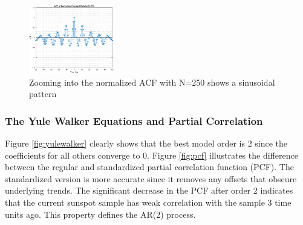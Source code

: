 \begin{figure}[h!]
\centering
\includegraphics[width = 0.33\textwidth]{sunspot_acf_250_zoom}
\caption{Zooming into the normalized ACF with N=250 shows a sinusoidal pattern}
\label{fig:sunspot_acf_250_zoom}
\end{figure}

\pagebreak

\subsubsection{The Yule Walker Equations and Partial Correlation}

Figure \ref{fig:yulewalker} clearly shows that the best model order is 2 since the coefficients for all others converge to 0. Figure \ref{fig:pcf} illustrates the difference between the regular and standardized partial correlation function (PCF). The standardized version is more accurate since it removes any offsets that obscure underlying trends. The significant decrease in the PCF after order 2 indicates that the current sunspot sample has weak correlation with the sample 3 time units ago. This property defines the AR(2) process.

